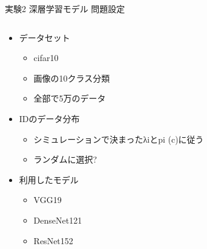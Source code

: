 \documentclass[unicode,12pt,aspectratio=169, dvipdfmx]{beamer}
\begin{document}
    \begin{frame}{実験2 深層学習モデル 問題設定}
        \begin{columns}
            \begin{column}[T]{.6\linewidth}
                \begin{itemize}
                    \item データセット
                    \begin{itemize}
                        \item cifar10
                        \item 画像の10クラス分類
                        \item 全部で5万のデータ
                    \end{itemize}
                    \item IDのデータ分布
                    \begin{itemize}
                        \item シミュレーションで決まったλiとpi (c)に従う
                        \item ランダムに選択?
                    \end{itemize}
                    \item 利用したモデル
                    \begin{itemize}
                        \item VGG19
                        \item DenseNet121
                        \item ResNet152
                    \end{itemize}
                \end{itemize}    
            \end{column}
            \begin{column}[T]{.5\linewidth}
                \begin{center}
                \end{center}
                \end{column}
        \end{columns}
    \end{frame}
\end{document}
